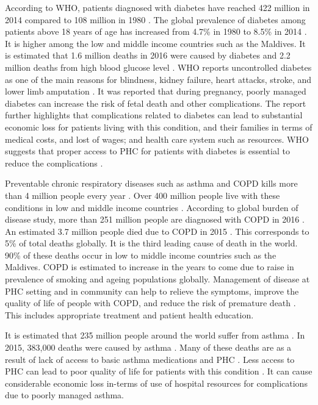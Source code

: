 According to WHO, patients diagnosed with diabetes have reached 422 million in 2014 compared to 108 million in 1980 \cite{WHO:health:2018}. The global prevalence of diabetes among patients above 18 years of age has increased from 4.7\% in 1980 to 8.5\% in 2014 \cite{WHO:health:2018}. It is higher among the low and middle income countries such as the Maldives. It is estimated that 1.6 million deaths in 2016 were caused by diabetes and 2.2 million deaths from high blood glucose level \cite{WHO:health:2018}. WHO reports uncontrolled diabetes as one of the main reasons for blindness, kidney failure, heart attacks, stroke, and lower limb amputation \cite{WHO:diabetes:2016}. It was reported that during pregnancy, poorly managed diabetes can increase the risk of fetal death and other complications. The report further highlights that complications related to diabetes can lead to substantial economic loss for patients living with this condition, and their families in terms of medical costs, and lost of wages; and health care system such as resources. WHO suggests that proper access to PHC for patients with diabetes is essential to reduce the complications \cite{WHO:diabetes:2016}. 

Preventable chronic respiratory diseases such as asthma and COPD kills more than 4 million people every year \cite{WHO:asthmacopd:2007}. Over 400 million people live with these conditions in low and middle income countries \cite{WHO:asthmacopd:2007}. According to global burden of disease study, more than 251 million people are diagnosed with COPD in 2016 \cite{WHO:health:2018}. An estimated 3.7 million people died due to COPD in 2015 \cite{WHO:health:2018}. This corresponds to 5\% of total deaths globally. It is the third leading cause of death in the world. 90\% of these deaths occur in low to middle income countries such as the Maldives. COPD is estimated to increase in the years to come due to raise in prevalence of smoking and ageing populations globally. Management of disease at PHC setting and in community can help to relieve the symptoms, improve the quality of life of people with COPD, and reduce the risk of premature death \cite{WHO:health:2018}. This includes appropriate treatment and patient health education.

It is estimated that 235 million people around the world suffer from asthma \cite{WHO:health:2018}. In 2015, 383,000 deaths were caused by asthma \cite{WHO:health:2018}. Many of these deaths are as a result of lack of access to basic asthma medications and PHC \cite{WHO:asthmacopd:2007}. Less access to PHC can lead to poor quality of life for patients with this condition \cite{WHO:asthmacopd:2007}. It can cause considerable economic loss in-terms of use of hospital resources for complications due to poorly managed asthma. 

